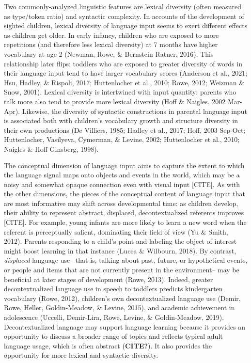 \documentclass[
  man,floatsintext]{apa6}
\begin{document}
Two commonly-analyzed linguistic features are lexical diversity (often measured as type/token ratio) and syntactic complexity. In accounts of the development of sighted children, lexical diversity of language input seems to exert different effects as children get older. In early infancy, children who are exposed to more repetitions (and therefore less lexical diversity) at 7 months have higher vocabulary at age 2 (Newman, Rowe, \& Bernstein Ratner, 2016). This relationship later flips: toddlers who are exposed to greater diversity of words in their language input tend to have larger vocabulary scores (Anderson et al., 2021; Hsu, Hadley, \& Rispoli, 2017; Huttenlocher et al., 2010; Rowe, 2012; Weizman \& Snow, 2001). Lexical diversity is intertwined with input quantity: parents who talk more also tend to provide more lexical diversity (Hoff \& Naigles, 2002 Mar-Apr). Likewise, the diversity of syntactic constructions in parental language input is associated both with children's vocabulary growth and structure diversity in their own productions (De Villiers, 1985; Hadley et al., 2017; Hoff, 2003 Sep-Oct; Huttenlocher, Vasilyeva, Cymerman, \& Levine, 2002; Huttenlocher et al., 2010; Naigles \& Hoff-Ginsberg, 1998).

The conceptual dimension of language input aims to capture the extent to which the language signal maps onto objects and events in the world, which may be a noisy and somewhat opaque connection even with visual input {[}CITE{]}. As with the other dimensions, the pieces of the conceptual content of language input that are most informative may shift across developmental time: as children develop, their ability to represent abstract, displaced, decontextualized referents improves {[}CITE{]}. For example, young infants are more likely to learn a new word when the referent is perceptually salient, dominating their field of view (Yu \& Smith, 2012). Parents responding to a child's point and labeling the object of interest might boost learning in that instance (Lucca \& Wilbourn, 2018). By contrast, \emph{displaced} language use-- that is, talking about past, future, or hypothetical events, or people and items that are not currently present in the environment-- may be beneficial at later stages of development (Rowe, 2013). Indeed, greater decontextualized language use in speech to toddlers predicts kindergarten vocabulary (Rowe, 2012), children's own decontextualized language use (Demir, Rowe, Heller, Goldin-Meadow, \& Levine, 2015), and academic achievement in adolescence (Uccelli, Demir-Lira, Rowe, Levine, \& Goldin-Meadow, 2019). Decontextualized language may support language learning because it provides an opportunity to discuss a broader range of topics and reflects typical adult language usage, which is often abstract (\textbf{CITE?}). It also provides the opportunity for more lexical and syntactic diversity.
\end{document}
